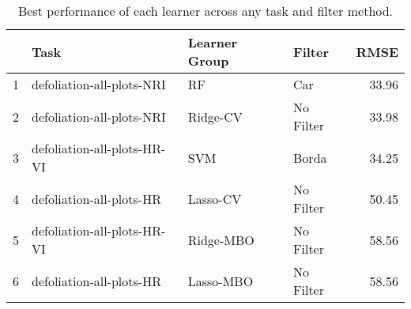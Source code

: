 \begin{table}[h!]
\centering
\caption{Best performance of each learner across any task and filter method.} 
\label{tab:best-learner-perf}
\begin{tabular}{rlllr}
  \hline
 & Task & Learner Group & Filter & RMSE \\ 
  \hline
1 & defoliation-all-plots-NRI & RF & Car & 33.96 \\ 
  2 & defoliation-all-plots-NRI & Ridge-CV & No Filter & 33.98 \\ 
  3 & defoliation-all-plots-HR-VI & SVM & Borda & 34.25 \\ 
  4 & defoliation-all-plots-HR & Lasso-CV & No Filter & 50.45 \\ 
  5 & defoliation-all-plots-HR-VI & Ridge-MBO & No Filter & 58.56 \\ 
  6 & defoliation-all-plots-HR & Lasso-MBO & No Filter & 58.56 \\ 
   \hline
\end{tabular}
\end{table}
